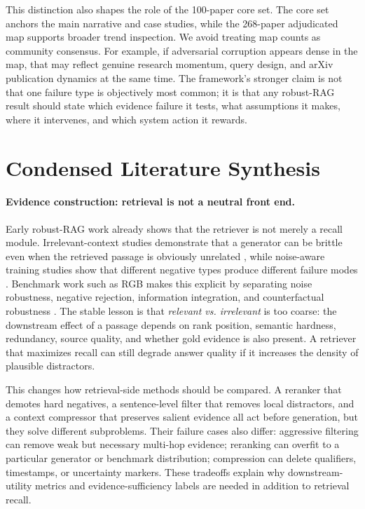 \documentclass[11pt]{article}
\begin{document}
This distinction also shapes the role of the 100-paper core set. The core set anchors the main narrative and case studies, while the 268-paper adjudicated map supports broader trend inspection. We avoid treating map counts as community consensus. For example, if adversarial corruption appears dense in the map, that may reflect genuine research momentum, query design, and arXiv publication dynamics at the same time. The framework's stronger claim is not that one failure type is objectively most common; it is that any robust-RAG result should state which evidence failure it tests, what assumptions it makes, where it intervenes, and which system action it rewards.

\section{Condensed Literature Synthesis}

\paragraph{Evidence construction: retrieval is not a neutral front end.}
Early robust-RAG work already shows that the retriever is not merely a recall module. Irrelevant-context studies demonstrate that a generator can be brittle even when the retrieved passage is obviously unrelated \citep{irrelevantContext2023}, while noise-aware training studies show that different negative types produce different failure modes \citep{raat2024}. Benchmark work such as RGB makes this explicit by separating noise robustness, negative rejection, information integration, and counterfactual robustness \citep{rgb2023}. The stable lesson is that \emph{relevant vs. irrelevant} is too coarse: the downstream effect of a passage depends on rank position, semantic hardness, redundancy, source quality, and whether gold evidence is also present. A retriever that maximizes recall can still degrade answer quality if it increases the density of plausible distractors.

This changes how retrieval-side methods should be compared. A reranker that demotes hard negatives, a sentence-level filter that removes local distractors, and a context compressor that preserves salient evidence all act before generation, but they solve different subproblems. Their failure cases also differ: aggressive filtering can remove weak but necessary multi-hop evidence; reranking can overfit to a particular generator or benchmark distribution; compression can delete qualifiers, timestamps, or uncertainty markers. These tradeoffs explain why downstream-utility metrics and evidence-sufficiency labels are needed in addition to retrieval recall.
\end{document}
